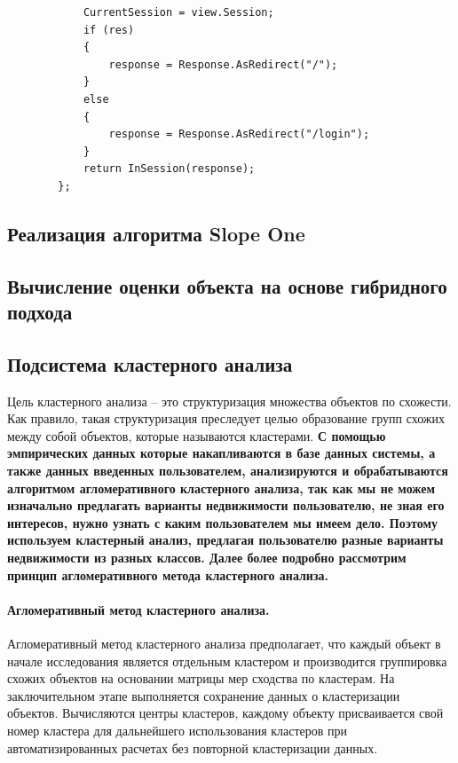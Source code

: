 \documentclass[a4paper,14pt,openany,final]{extreport} %
\begin{document}
{\begin{pzlisting}
\begin{verbatim}
            CurrentSession = view.Session;
            if (res)
            {
                response = Response.AsRedirect("/");
            }
            else
            {
                response = Response.AsRedirect("/login");
            }
            return InSession(response);
        };
\end{verbatim}
\end{pzlisting}

\subsection{Реализация алгоритма Slope One}
\subsection{Вычисление оценки объекта на основе гибридного подхода}
\subsection{Подсистема кластерного анализа}

Цель кластерного анализа -- это структуризация множества объектов по схожести. Как правило, такая структуризация преследует целью образование групп схожих между собой объектов, которые называются кластерами. \textbf{С помощью эмпирических данных которые накапливаются в базе данных системы, а также данных введенных пользователем, анализируются и обрабатываются алгоритмом агломеративного кластерного анализа, так как мы не можем изначально предлагать варианты недвижимости пользователю, не зная его интересов, нужно узнать с каким пользователем мы имеем дело. Поэтому используем кластерный анализ, предлагая пользователю разные варианты недвижимости из разных классов. Далее более подробно рассмотрим принцип агломеративного метода кластерного анализа.}

\paragraph{Агломеративный метод кластерного анализа.}
Агломеративный метод кластерного анализа предполагает, что каждый объект в начале исследования является отдельным кластером и производится группировка схожих объектов на основании матрицы мер сходства по кластерам. На заключительном этапе выполняется сохранение данных о кластеризации объектов. Вычисляются центры кластеров, каждому объекту присваивается свой номер кластера для дальнейшего использования кластеров при автоматизированных расчетах без повторной кластеризации данных.

}
\end{document}
